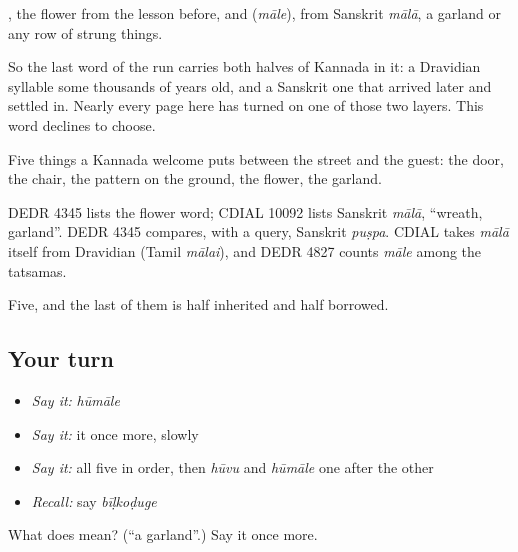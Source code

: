 , the flower from the lesson before, and  (\emph{māle}), from Sanskrit \emph{mālā}, a garland or any row of strung things.

So the last word of the run carries both halves of Kannada in it: a Dravidian syllable some thousands of years old, and a Sanskrit one that arrived later and settled in. Nearly every page here has turned on one of those two layers. This word declines to choose.

Five things a Kannada welcome puts between the street and the guest: the door, the chair, the pattern on the ground, the flower, the garland.

DEDR 4345 lists the flower word; CDIAL 10092 lists Sanskrit \emph{mālā}, \textquotedblleft{}wreath, garland\textquotedblright{}. DEDR 4345 compares, with a query, Sanskrit \emph{puṣpa}. CDIAL takes \emph{mālā} itself from Dravidian (Tamil \emph{mālai}), and DEDR 4827 counts \emph{māle} among the tatsamas.

\begin{grammarlens}[title={What you've built}]
Five, and the last of them is half inherited and half borrowed.
\end{grammarlens}

\subsection*{Your turn}
\begin{itemize}
\raggedright
  \item \emph{Say it:} \emph{hūmāle}
  \item \emph{Say it:} it once more, slowly
  \item \emph{Say it:} all five in order, then \emph{hūvu} and \emph{hūmāle} one after the other
  \item \emph{Recall:} say \emph{bīḷkoḍuge}
\end{itemize}

\begin{tcolorbox}[breakable,colback=teal!4,colframe=teal!35!black,title={Before you move on}]
What does  mean? (\textquotedblleft{}a garland\textquotedblright{}.) Say it once more.
\end{tcolorbox}
